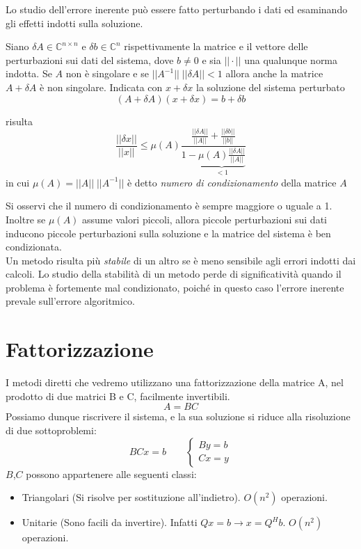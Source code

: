 Lo studio dell’errore inerente può essere fatto perturbando i dati ed
esaminando gli effetti indotti sulla soluzione.

\begin{theo}
Siano $\delta A \in \mathbb{C}^{n \times n}$ e $\delta b \in
\mathbb{C}^n$ rispettivamente la matrice e il vettore delle
perturbazioni sui dati del sistema, dove $b \neq 0$ e sia $|| \cdot
||$ una qualunque norma indotta. Se $A$ non \`e singolare e se $||
A^{-1}|| \; || \delta A|| < 1$ allora anche la matrice $A + \delta A$
\`e non singolare. Indicata con $x + \delta x$ la soluzione del sistema perturbato
$$(A + \delta A) (x + \delta x) = b + \delta b$$

risulta 
$$ \frac{||\delta x||}{||x||} \leq \mu(A)
\frac{ \frac{|| \delta A||}{||A||} + 
\frac{|| \delta b||}{||b||}}{1 - \underbrace{\mu(A) \frac{||\delta A||}{||A||}}_{<1}}
$$
in cui $ \mu(A)  = ||A|| \; ||A^{-1}|| $ \`e detto \emph{numero di
  condizionamento} della matrice $A$
\end{theo}

Si osservi che il numero di condizionamento \`e sempre maggiore o
uguale a 1. Inoltre se $\mu(A)$ assume valori piccoli, allora piccole
perturbazioni sui dati inducono piccole perturbazioni sulla soluzione
e la matrice del sistema \`e ben condizionata.\\
Un metodo risulta più \emph{stabile} di un altro se \`e meno sensibile
agli errori indotti dai calcoli. Lo studio della stabilit\`a di un
metodo perde di significativit\`a quando il problema \`e fortemente mal
condizionato, poich\'e in questo caso l’errore inerente prevale
sull’errore algoritmico.




\section{Fattorizzazione}
I metodi diretti che vedremo utilizzano una fattorizzazione della
matrice A, nel prodotto di due matrici B e C, facilmente invertibili.
$$ A = BC $$
Possiamo dunque riscrivere il sistema, e la sua soluzione si riduce
alla risoluzione di due sottoproblemi:
$$ BCx = b \qquad
\left\{ 
  \begin{array}{l}
  By = b\\
  Cx = y                                         
  \end{array}
\right.
$$
$B$,$C$ possono appartenere alle seguenti classi:
\begin{itemize}
 \item Triangolari (Si risolve per sostituzione
   all'indietro). $O(n^2)$ operazioni.
 \item Unitarie (Sono facili da invertire). Infatti
     $Qx =b \rightarrow x =Q^{H}b$. $O(n^2)$ operazioni.
\end{itemize}

